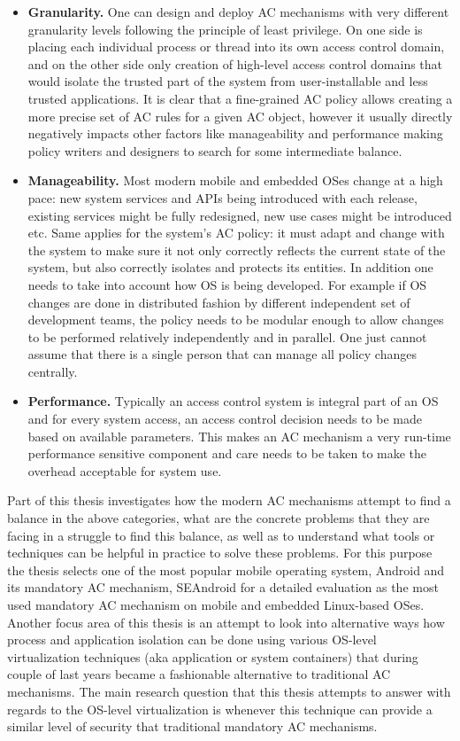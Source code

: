 \begin{itemize}
	\item \textbf{Granularity.} One can design and deploy AC mechanisms with very different granularity levels following the principle of least privilege. On one side is placing each individual process or thread into its own access control domain, and on the other side only creation of high-level access control domains that would isolate the trusted part of the system from user-installable and less trusted applications. It is clear that a fine-grained AC policy allows creating a more precise set of AC rules for a given AC object, however it usually directly negatively impacts other factors like manageability and performance making policy writers and designers to search for some intermediate balance.    
	\item \textbf{Manageability.} Most modern mobile and embedded OSes change at a high pace: new system services and APIs being introduced with each release, existing services might be fully redesigned, new use cases might be introduced etc. Same applies for the system's AC policy: it must adapt and change with the system to make sure it not only correctly reflects the current state of the system, but also correctly isolates and protects its entities. In addition one needs to take into account how OS is being developed. For example if OS changes are done in distributed fashion by different independent set of development teams, the policy needs to be modular enough to allow changes to be performed relatively independently and in parallel. One just cannot assume that there is a single person that can manage all policy changes centrally.  
	\item \textbf{Performance.} Typically an access control system is integral part of an OS and for every system access, an access control decision needs to be made based on available parameters. This makes an AC mechanism a very run-time performance sensitive component and care needs to be taken to make the overhead acceptable for system use. 
\end{itemize}

Part of this thesis investigates how the modern AC mechanisms attempt to find a balance in the above categories, what are the concrete problems that they are facing in a struggle to find this balance, as well as to understand what tools or techniques can be helpful in practice to solve these problems. For this purpose the thesis selects one of the most popular mobile operating system, Android and its mandatory AC mechanism, SEAndroid for a detailed evaluation as the most used mandatory AC mechanism on mobile and embedded Linux-based OSes. Another focus area of this thesis is an attempt to look into alternative ways how process and application isolation can be done using various OS-level virtualization  techniques (aka application or system containers) that during couple of last years became a fashionable alternative to traditional AC mechanisms. The main research question that this thesis attempts to answer with regards to the OS-level virtualization is whenever this technique can provide a similar level of security that traditional mandatory AC mechanisms. 


